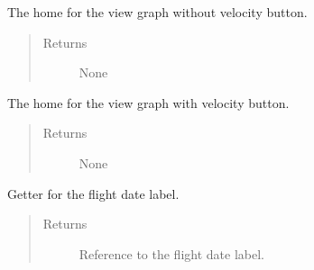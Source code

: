 \documentclass[letterpaper,10pt,english]{sphinxmanual}
\begin{document}
\begin{fulllineitems}
\begin{fulllineitems}
\begin{quote}
\begin{description}
\end{description}\end{quote}

\end{fulllineitems}


\begin{fulllineitems}
\label{\detokenize{index:src.Views.View_ReportScreen.ReportWindow.del_BtnViewGraphNoVelocity}}
The home for the view graph without velocity button.
\begin{quote}\begin{description}
\item[{Returns}] \leavevmode
None

\end{description}\end{quote}

\end{fulllineitems}


\begin{fulllineitems}
\label{\detokenize{index:src.Views.View_ReportScreen.ReportWindow.del_BtnViewGraphVelocity}}
The home for the view graph with velocity button.
\begin{quote}\begin{description}
\item[{Returns}] \leavevmode
None

\end{description}\end{quote}

\end{fulllineitems}


\begin{fulllineitems}
\label{\detokenize{index:src.Views.View_ReportScreen.ReportWindow.del_LblFlightDate}}
Getter for the flight date label.
\begin{quote}\begin{description}
\item[{Returns}] \leavevmode
Reference to the flight date label.


\end{description}
\end{quote}
\end{fulllineitems}
\end{fulllineitems}
\end{document}

